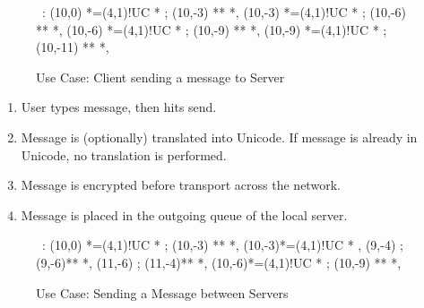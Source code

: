 

\begin{figure}[ht]

\small

\begin{center}

\ \xy<1cm,0cm>:
(10,0) 	*=(4,1)!UC *\frm{-} ;
(10,-3) **\dir{-} *\dir{>},
(10,-3)	*=(4,1)!UC *\frm{--} ; 
(10,-6) **\dir{-} *\dir{>},
(10,-6)	*=(4,1)!UC *\frm{--} ; 
(10,-9) **\dir{-} *\dir{>},
(10,-9)	*=(4,1)!UC *\frm{-} ; 
(10,-11) **\dir{=} *\dir{>},
\endxy

\end{center}

\caption{Use Case: Client sending a message to Server}

\end{figure}


\begin{enumerate}

\item User types message, then hits send.

\item Message is (optionally) translated into Unicode. If message is
already in Unicode, no translation is performed.

\item Message is encrypted before transport across the network.

\item Message is placed in the outgoing queue of the local server.

\end{enumerate}


\begin{figure}[ht]

\small

\begin{center}

\ \xy<1cm,0cm>:
(10,0) *=(4,1)!UC *\frm{-} ;
(10,-3) **\dir{-} *\dir{>},
(10,-3)*=(4,1)!UC *\frm{-} , 
(9,-4) ; (9,-6)**\dir{-} *\dir{>},
(11,-6) ; (11,-4)**\dir{--} *\dir{>},
(10,-6)*=(4,1)!UC *\frm{-} ; 
(10,-9) **\dir{=} *\dir{>},
\endxy

\end{center}

\caption{Use Case: Sending a Message between Servers}

\end{figure}


